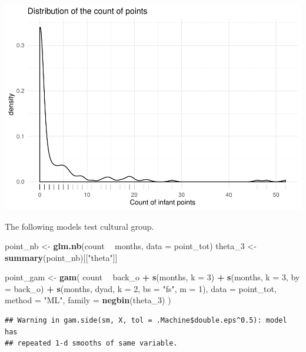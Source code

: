 \documentclass[]{article}
\newenvironment{Shaded}{\begin{snugshade}}{\end{snugshade}}
\newcommand{\DataTypeTok}[1]{\textcolor[rgb]{0.13,0.29,0.53}{#1}}
\newcommand{\DecValTok}[1]{\textcolor[rgb]{0.00,0.00,0.81}{#1}}
\newcommand{\KeywordTok}[1]{\textcolor[rgb]{0.13,0.29,0.53}{\textbf{#1}}}
\newcommand{\NormalTok}[1]{#1}
\newcommand{\OperatorTok}[1]{\textcolor[rgb]{0.81,0.36,0.00}{\textbf{#1}}}
\newcommand{\StringTok}[1]{\textcolor[rgb]{0.31,0.60,0.02}{#1}}
\begin{document}
\includegraphics{supplement_files/figure-latex/points-1.pdf}

The following models test cultural group.

\begin{Shaded}
\begin{Highlighting}[]
\NormalTok{point_nb <-}\StringTok{ }\KeywordTok{glm.nb}\NormalTok{(count }\OperatorTok{~}\StringTok{ }\NormalTok{months, }\DataTypeTok{data =}\NormalTok{ point_tot)}
\NormalTok{theta_}\DecValTok{3}\NormalTok{ <-}\StringTok{ }\KeywordTok{summary}\NormalTok{(point_nb)[[}\StringTok{"theta"}\NormalTok{]]}

\NormalTok{point_gam <-}\StringTok{ }\KeywordTok{gam}\NormalTok{(}
\NormalTok{  count }\OperatorTok{~}
\StringTok{    }\NormalTok{back_o }\OperatorTok{+}
\StringTok{    }\KeywordTok{s}\NormalTok{(months, }\DataTypeTok{k =} \DecValTok{3}\NormalTok{) }\OperatorTok{+}
\StringTok{    }\KeywordTok{s}\NormalTok{(months, }\DataTypeTok{k =} \DecValTok{3}\NormalTok{, }\DataTypeTok{by =}\NormalTok{ back_o) }\OperatorTok{+}
\StringTok{    }\KeywordTok{s}\NormalTok{(months, dyad, }\DataTypeTok{k =} \DecValTok{2}\NormalTok{, }\DataTypeTok{bs =} \StringTok{"fs"}\NormalTok{, }\DataTypeTok{m =} \DecValTok{1}\NormalTok{),}
  \DataTypeTok{data =}\NormalTok{ point_tot,}
  \DataTypeTok{method =} \StringTok{"ML"}\NormalTok{,}
  \DataTypeTok{family =} \KeywordTok{negbin}\NormalTok{(theta_}\DecValTok{3}\NormalTok{)}
\NormalTok{)}
\end{Highlighting}
\end{Shaded}

\begin{verbatim}
## Warning in gam.side(sm, X, tol = .Machine$double.eps^0.5): model has
## repeated 1-d smooths of same variable.
\end{verbatim}
\end{document}
